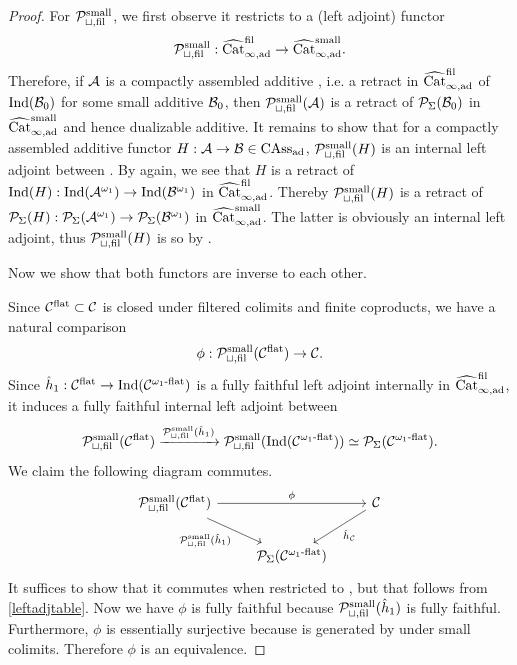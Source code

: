 \documentclass[a4paper,10pt, oneside]{amsart}
\begin{document}
\begin{proof}
		For $\mathcal{P}_{\sqcup,\mathrm{fil}}^{\mathrm{small}}$, we first observe it restricts to a (left adjoint) functor  
		$$\mathcal{P}_{\sqcup,\mathrm{fil}}^{\mathrm{small}}: \widehat{\mathrm{Cat}}_{\infty,\mathrm{ad}}^{\mathrm{fil}}\to \widehat{\mathrm{Cat}}_{\infty,\mathrm{ad}}^{\mathrm{small}}.$$
		Therefore, if $\mathcal{A}$ is a compactly assembled additive \infcat, i.e. a retract  in $\widehat{\mathrm{Cat}}_{\infty,\mathrm{ad}}^{\mathrm{fil}}$ of $\mathrm{Ind}(\mathcal{B}_0)$ for some small additive \infcat $\mathcal{B}_0$, then $\mathcal{P}_{\sqcup,\mathrm{fil}}^{\mathrm{small}}(\mathcal{A})$ is a retract of $\mathcal{P}_\Sigma(\mathcal{B}_0)$ in $\widehat{\mathrm{Cat}}_{\infty,\mathrm{ad}}^{\mathrm{small}}$ and hence dualizable additive. It remains to show that for a compactly assembled additive functor $H:\mathcal{A} \to\mathcal{B} \in\mathrm{CAss}_{\mathrm{ad}}$, $\mathcal{P}_{\sqcup,\mathrm{fil}}^{\mathrm{small}}(H)$ is an internal left adjoint between \dualaddinfcats. By  \cite[Corollary 2.43]{ramzi2024dualizable} again, we see that $H$ is a retract of $\mathrm{Ind}(H): \mathrm{Ind}(\mathcal{A}^{\omega_1})\to \mathrm{Ind}(\mathcal{B}^{\omega_1})$ in $\widehat{\mathrm{Cat}}_{\infty,\mathrm{ad}}^{\mathrm{fil}}$. Thereby $\mathcal{P}_{\sqcup,\mathrm{fil}}^{\mathrm{small}}(H)$ is a retract of $\mathcal{P}_\Sigma(H): \mathcal{P}_\Sigma(\mathcal{A}^{\omega_1})\to \mathcal{P}_\Sigma(\mathcal{B}^{\omega_1})$ in $\widehat{\mathrm{Cat}}_{\infty,\mathrm{ad}}^{\mathrm{small}}$. The latter is obviously an internal left adjoint, thus $\mathcal{P}_{\sqcup,\mathrm{fil}}^{\mathrm{small}}(H)$ is so by \cite[Lemma 1.47]{ramzi2024dualizable}.
		
		Now we show that both functors are inverse to each other. 
		
		Since $\mathcal{C}^{\mathrm{flat}}\subset\mathcal{C}$ is closed under filtered colimits and finite coproducts, we have a  natural comparison
		$$\phi:\mathcal{P}_{\sqcup,\mathrm{fil}}^{\mathrm{small}}(\mathcal{C}^{\mathrm{flat}})\to \mathcal{C} . $$
		Since $\hat{h}_1:\mathcal{C}^{\mathrm{flat}}\to \mathrm{Ind}(\mathcal{C}^{\omega_1\text{-}\mathrm{flat}})$ is a  fully faithful left adjoint internally in $\widehat{\mathrm{Cat}}_{\infty,\mathrm{ad}}^{\mathrm{fil}}$, it induces a fully faithful internal left adjoint between \dualaddinfcats $$\mathcal{P}_{\sqcup,\mathrm{fil}}^{\mathrm{small}}(\mathcal{C}^{\mathrm{flat}})\xrightarrow{\mathcal{P}_{\sqcup,\mathrm{fil}}^{\mathrm{small}}(\hat{h}_1)} \mathcal{P}_{\sqcup,\mathrm{fil}}^{\mathrm{small}}(\mathrm{Ind}(\mathcal{C}^{\omega_1\text{-}\mathrm{flat}}))\simeq \mathcal{P}_\Sigma(\mathcal{C}^{\omega_1\text{-}\mathrm{flat}}) .$$
		We claim the following diagram commutes.
		$$
		\begin{tikzcd}
			{\mcp_{\sqcup,\op{fil}}^{\op{small}}(\mcc^{\op{flat}})} \arrow[rd, "{\mcp_{\sqcup,\op{fil}}^{\op{small}}(\hat{h}_1)}"'] \arrow[rr, "\phi"] &                      & {\mcc} \arrow[ld, "\hat{h}_\mcc"] \\
			& \mcp_\Sigma(\cflatw) &                              
		\end{tikzcd}$$
		It suffices to show that it commutes when restricted to \cflat, but that follows from \cref{leftadjtable}. Now we have $\phi$ is fully faithful because $\mathcal{P}_{\sqcup,\mathrm{fil}}^{\mathrm{small}}(\hat{h}_1)$ is fully faithful. Furthermore, $\phi$ is essentially surjective because \mcc is generated by \cflat under small colimits. Therefore $\phi$ is an equivalence.
		

\end{proof}
\end{document}
